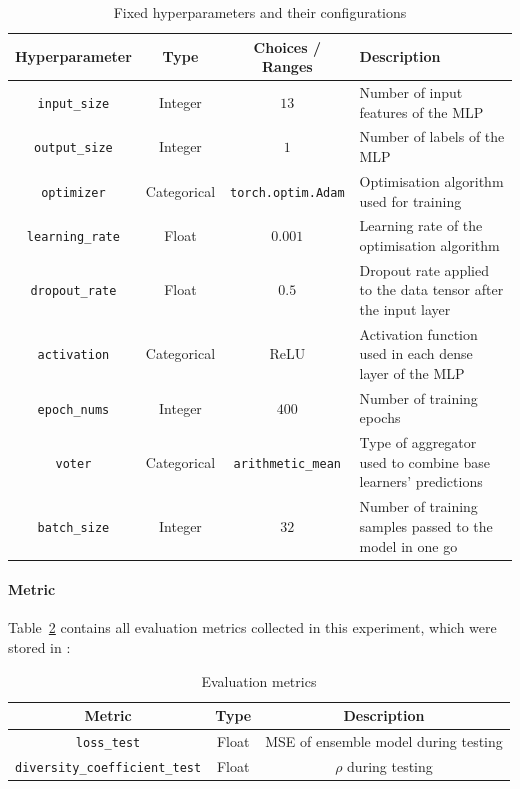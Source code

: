 \documentclass{article}
\begin{document}
\begin{table}[H]
    \centering
    \begin{tabular}{|c|c|c|p{5cm}|}
        \hline
        Hyperparameter & Type & Choices / Ranges & Description \\
        \hline
        \small\texttt{input\_size} & Integer & $13$ & Number of input features of the MLP \\
        \hline
        \small\texttt{output\_size} & Integer & $1$ & Number of labels of the MLP \\
        \hline
        \small\texttt{optimizer} & Categorical & \texttt{torch.optim.Adam} & Optimisation algorithm used for training \\
        \hline
        \small\texttt{learning\_rate} & Float & $0.001$ & Learning rate of the optimisation algorithm \\
        \hline
        \small\texttt{dropout\_rate} & Float & $0.5$ & Dropout rate applied to the data tensor after the input layer \\
        \hline
        \small\texttt{activation} & Categorical & ReLU & Activation function used in each dense layer of the MLP \\
        \hline
        \small\texttt{epoch\_nums} & Integer & $400$ & Number of training epochs \\
        \hline
        \small\texttt{voter} & Categorical & \texttt{arithmetic\_mean} & Type of aggregator used to combine base learners' predictions \\
        \hline
        \small\texttt{batch\_size} & Integer & $32$ & Number of training samples passed to the model in one go \\
        \hline
    \end{tabular}
    \caption{Fixed hyperparameters and their configurations}
    \label{table:experiment_3_fixed_hyperparameters}
\end{table}

\paragraph{Metric}
Table~\ref{table:experiment_3_metric} contains all evaluation metrics collected in this experiment, which were stored in : 

\begin{table}[H]
    \centering
    \begin{tabular}{|c|c|c|}
        \hline
        Metric & Type & Description \\
        \hline
        \small\texttt{loss\_test} & Float & MSE of ensemble model during testing \\
        \hline
        \small\texttt{diversity\_coefficient\_test} & Float & $\rho$ during testing \\
        \hline
    \end{tabular}
    \caption{Evaluation metrics}
    \label{table:experiment_3_metric}
\end{table}
\end{document}
